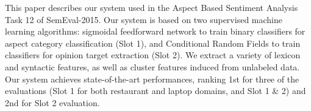 This paper describes our system used in the Aspect Based Sentiment Analysis Task 12 of SemEval-2015. Our system is based on two supervised machine learning algorithms: sigmoidal feedforward network to train binary classifiers for aspect category classification (Slot 1), and Conditional Random Fields to train classifiers for opinion target extraction (Slot 2). We extract a variety of lexicon and syntactic features, as well as cluster features induced from unlabeled data. Our system achieves state-of-the-art performances, ranking 1st for three of the evaluations (Slot 1 for both restaurant and laptop domains, and Slot 1 \& 2) and 2nd for Slot 2 evaluation.
